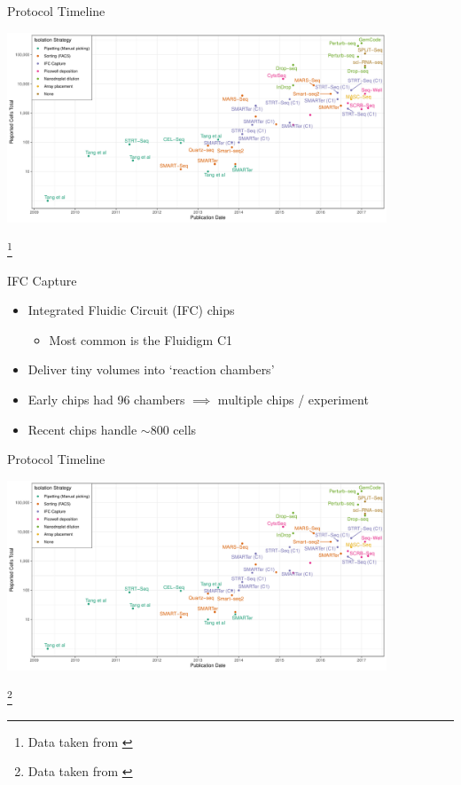 \documentclass[aspectratio=169,11pt]{beamer}
\newcommand\blfootnote[1]{%
  \begingroup
  \renewcommand\thefootnote{}\footnote{#1}%
  \addtocounter{footnote}{-1}%
  \endgroup
}
\begin{document}
\begin{frame}{Protocol Timeline}

	\begin{center}
		\includegraphics[width=0.85\textwidth]{figures/scRNATimeline.pdf} 
	\end{center}

	\blfootnote{Data taken from \cite{pmid29494575}}

\end{frame}

\begin{frame}{IFC Capture}

	\begin{itemize}
		\item Integrated Fluidic Circuit (IFC) chips
		\begin{itemize}
			\item Most common is the Fluidigm C1
		\end{itemize}
		\item Deliver tiny volumes into `reaction chambers'
		\item Early chips had 96 chambers $\implies$ multiple chips / experiment
		\item Recent chips handle $\sim$800 cells
	\end{itemize}

\end{frame}

\begin{frame}{Protocol Timeline}

	\begin{center}
		\includegraphics[width=0.85\textwidth]{figures/scRNATimeline.pdf} 
	\end{center}

	\blfootnote{Data taken from \cite{pmid29494575}}

\end{frame}
\end{document}
